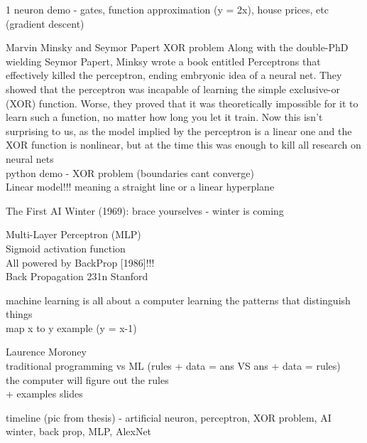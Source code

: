 \documentclass[10pt, compress]{beamer}
\begin{document}
\begin{frame}
  1 neuron demo - gates, function approximation (y = 2x), house prices, etc \\
(gradient descent)
\end{frame}


\begin{frame}

\vspace*{.5cm}
Marvin Minsky and Seymor Papert XOR problem
Along with the double-PhD wielding Seymor Papert, Minksy wrote a book entitled Perceptrons that effectively killed the perceptron, ending embryonic idea of a neural net. They showed that the perceptron was incapable of learning the simple exclusive-or (XOR) function. Worse, they proved that it was theoretically impossible for it to learn such a function, no matter how long you let it train. Now this isn’t surprising to us, as the model implied by the perceptron is a linear one and the XOR function is nonlinear, but at the time this was enough to kill all research on neural nets \\

python demo - XOR problem (boundaries cant converge) \\
Linear model!!! meaning a straight line or a linear hyperplane


The First AI Winter (1969): brace yourselves - winter is coming

\end{frame}

\begin{frame}
Multi-Layer Perceptron (MLP) \\
Sigmoid activation function \\

All powered by BackProp [1986]!!! \\
Back Propagation 231n Stanford
\end{frame}

\begin{frame}
machine learning is all about a computer learning the patterns that distinguish things \\
map x to y example (y = x-1)
\end{frame}

\begin{frame}
  Laurence Moroney \\
traditional programming vs ML (rules + data = ans VS ans + data = rules) \\
the computer will figure out the rules \\
+ examples slides
\end{frame}

\begin{frame}
timeline (pic from thesis) - artificial neuron, perceptron, XOR problem, AI winter, back prop, MLP, AlexNet
\end{frame}
\end{document}
